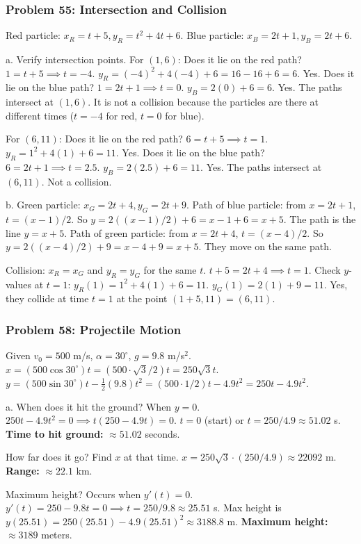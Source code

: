 \documentclass{article}
\begin{document}
\subsubsection{Problem 55: Intersection and Collision}
Red particle: \(x_R=t+5, y_R=t^2+4t+6\).
Blue particle: \(x_B=2t+1, y_B=2t+6\).

a. Verify intersection points.
For \((1,6)\): Does it lie on the red path? \(1=t+5 \implies t=-4\). \(y_R = (-4)^2+4(-4)+6 = 16-16+6=6\). Yes.
Does it lie on the blue path? \(1=2t+1 \implies t=0\). \(y_B = 2(0)+6=6\). Yes.
The paths intersect at \((1,6)\). It is not a collision because the particles are there at different times (\(t=-4\) for red, \(t=0\) for blue).

For \((6,11)\): Does it lie on the red path? \(6=t+5 \implies t=1\). \(y_R = 1^2+4(1)+6 = 11\). Yes.
Does it lie on the blue path? \(6=2t+1 \implies t=2.5\). \(y_B = 2(2.5)+6=11\). Yes.
The paths intersect at \((6,11)\). Not a collision.

b. Green particle: \(x_G=2t+4, y_G=2t+9\).
Path of blue particle: from \(x=2t+1\), \(t=(x-1)/2\). So \(y=2((x-1)/2)+6 = x-1+6=x+5\). The path is the line \(y=x+5\).
Path of green particle: from \(x=2t+4\), \(t=(x-4)/2\). So \(y=2((x-4)/2)+9 = x-4+9=x+5\). They move on the same path.

Collision: \(x_R=x_G\) and \(y_R=y_G\) for the same \(t\).
\(t+5 = 2t+4 \implies t=1\).
Check \(y\)-values at \(t=1\):
\(y_R(1) = 1^2+4(1)+6=11\).
\(y_G(1) = 2(1)+9=11\).
Yes, they collide at time \(t=1\) at the point \((1+5, 11) = (6,11)\).

\subsubsection{Problem 58: Projectile Motion}
Given \(v_0=500\) m/s, \(\alpha=30^\circ\), \(g=9.8\) m/s\(^2\).
\(x = (500\cos 30^\circ)t = (500 \cdot \sqrt{3}/2)t = 250\sqrt{3}t\).
\(y = (500\sin 30^\circ)t - \frac{1}{2}(9.8)t^2 = (500 \cdot 1/2)t - 4.9t^2 = 250t - 4.9t^2\).

a. When does it hit the ground? When \(y=0\).
\(250t - 4.9t^2 = 0 \implies t(250 - 4.9t) = 0\).
\(t=0\) (start) or \(t = 250/4.9 \approx 51.02\) s.
\textbf{Time to hit ground:} \(\approx 51.02\) seconds.

How far does it go? Find \(x\) at that time.
\(x = 250\sqrt{3} \cdot (250/4.9) \approx 22092\) m.
\textbf{Range:} \(\approx 22.1\) km.

Maximum height? Occurs when \(y'(t)=0\).
\(y'(t) = 250 - 9.8t = 0 \implies t = 250/9.8 \approx 25.51\) s.
Max height is \(y(25.51) = 250(25.51) - 4.9(25.51)^2 \approx 3188.8\) m.
\textbf{Maximum height:} \(\approx 3189\) meters.
\end{document}
